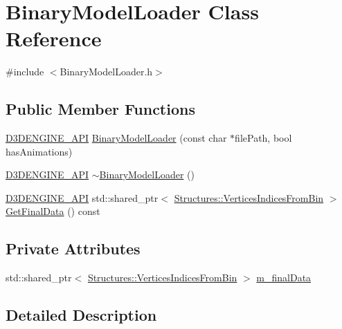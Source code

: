 \hypertarget{class_binary_model_loader}{}\section{Binary\+Model\+Loader Class Reference}
\label{class_binary_model_loader}


{\ttfamily \#include $<$Binary\+Model\+Loader.\+h$>$}

\subsection*{Public Member Functions}
\begin{DoxyCompactItemize}
\item 
\mbox{\hyperlink{stdafx_8h_a8ee2d990c5dfba7794dd2b60741d7722}{D3\+D\+E\+N\+G\+I\+N\+E\+\_\+\+A\+PI}} \mbox{\hyperlink{class_binary_model_loader_a0594b3d1be895c53bb661e589afa80f7}{Binary\+Model\+Loader}} (const char $\ast$file\+Path, bool has\+Animations)
\item 
\mbox{\hyperlink{stdafx_8h_a8ee2d990c5dfba7794dd2b60741d7722}{D3\+D\+E\+N\+G\+I\+N\+E\+\_\+\+A\+PI}} \mbox{\hyperlink{class_binary_model_loader_a68575fb4ad2b9dd0dc8845518917b2de}{$\sim$\+Binary\+Model\+Loader}} ()
\item 
\mbox{\hyperlink{stdafx_8h_a8ee2d990c5dfba7794dd2b60741d7722}{D3\+D\+E\+N\+G\+I\+N\+E\+\_\+\+A\+PI}} std\+::shared\+\_\+ptr$<$ \mbox{\hyperlink{struct_structures_1_1_vertices_indices_from_bin}{Structures\+::\+Vertices\+Indices\+From\+Bin}} $>$ \mbox{\hyperlink{class_binary_model_loader_a8cc9581014e91f62f10e00c924fc8558}{Get\+Final\+Data}} () const
\end{DoxyCompactItemize}
\subsection*{Private Attributes}
\begin{DoxyCompactItemize}
\item 
std\+::shared\+\_\+ptr$<$ \mbox{\hyperlink{struct_structures_1_1_vertices_indices_from_bin}{Structures\+::\+Vertices\+Indices\+From\+Bin}} $>$ \mbox{\hyperlink{class_binary_model_loader_ad91d8149dfde26ed2949bd05b854974a}{m\+\_\+final\+Data}}
\end{DoxyCompactItemize}


\subsection{Detailed Description}


